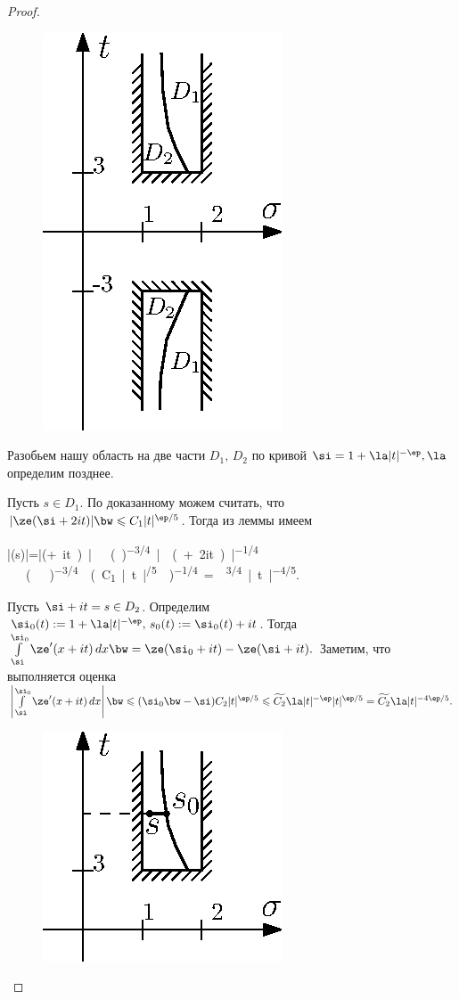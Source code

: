 \begin{proof}
  \begin{figure}
    \vskip -40pt
    \includegraphics[scale=1.0]{pics/0402}
  \end{figure}

  Разобьем нашу область на две части $D_1,\,D_2$ по кривой $\si=1+\la|t|^{-\ep}, \la$ определим позднее.

   Пусть $s\in D_1$. По доказанному можем считать, что $|\ze(\si+2it)| \bw\leqslant C_1|t|^{\ep/5}$. Тогда из леммы имеем
  \begin{mlc*}
    |\ze(s)|=|\ze(\si+it)|\ge\ze(\si)^{-3/4}|\ze(\si+2it)|^{-1/4}\ge\\\ge
    \left(\right)^{-3/4}\left(C_1|t|^{\ep/5}\right)^{-1/4}=\la^{3/4}|t|^{-{4\ep}/5}.
  \end{mlc*}

   Пусть $\si+it=s\in D_2$. Определим $\si_0(t):=1+\la|t|^{-\ep},\,s_0(t):=\si_0(t)+it$.
  Тогда $\intlim_\si^{\si_0}\ze'(x+it)\,dx\bw=\ze(\si_0+it)-\ze(\si+it).$ Заметим, что выполняется оценка
  $\left|\intlim_\si^{\si_0}\ze'(x+it)\,dx\right|\bw\leqslant(\si_0\bw-\si)C_2|t|^{\ep/5}\leqslant\widetilde{C_2}\la|t|^{-\ep}|t|^{\ep/5}=\widetilde{C_2}\la|t|^{-4\ep/5}.$

  \begin{figure}
    \vskip -50pt
    \includegraphics[scale=1.0]{pics/0403}
  \end{figure}


\end{proof}
